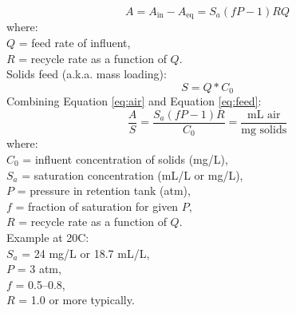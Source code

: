 \documentclass[a4paper, landscape, 8pt]{extarticle}
\begin{document}
\begin{multicols}{4}
\begin{equation}
    A = A_{\text{in}} - A_{\text{eq}}= S_a(fP-1)RQ \label{eq:air}
\end{equation}
where:\\
$Q$ = feed rate of influent,\\
$R$ = recycle rate as a function of $Q$.\\
Solids feed (a.k.a. mass loading):
\begin{equation}
    S = Q*C_0 \label{eq:feed}
\end{equation}
Combining Equation \ref{eq:air} and Equation \ref{eq:feed}:
\[
\frac{A}{S} = \frac{S_a(fP-1)R}{C_0} = \frac{\text{mL air}}{\text{mg solids}}
\]
where:\\
$C_0$ = influent concentration of solids (mg/L),\\
$S_a$ = saturation concentration (mL/L or mg/L),\\
$P$ = pressure in retention tank (atm),\\
$f$ = fraction of saturation for given $P$,\\
$R$ = recycle rate as a function of $Q$.\\
Example at 20\textdegree C:\\
$S_a$ = 24 mg/L or 18.7 mL/L,\\
$P$ = 3 atm,\\
$f$ = 0.5--0.8,\\
$R$ = 1.0 or more typically.

\end{multicols}
\end{document}
